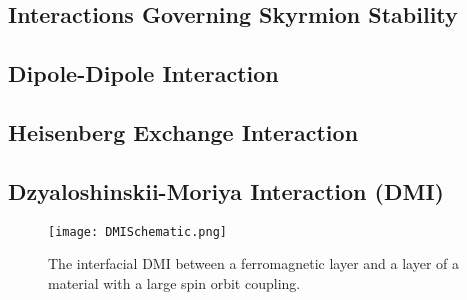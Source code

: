     \subsection{Interactions Governing Skyrmion Stability}\label{subsec:InteractionsGovSkyrmions}

    \subsection*{Dipole-Dipole Interaction}\label{subsec:DipoleInt}

    \subsection*{Heisenberg Exchange Interaction}\label{subsec:ExchangeInt}

    \subsection*{Dzyaloshinskii-Moriya Interaction (DMI)}\label{subsec:DMI}
    \begin{figure}[htbp]
	    \centering	\texttt{[image: DMISchematic.png]}
	    \caption{The interfacial DMI between a ferromagnetic layer and a layer of a material with a large spin orbit coupling.}
	    \label{fig:DMISchematic}
    \end{figure}
